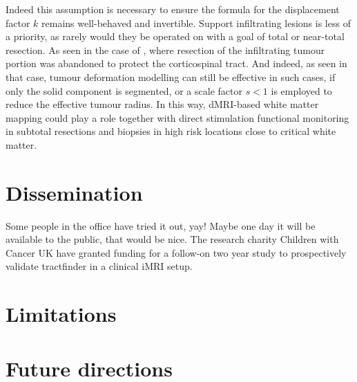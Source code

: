 Indeed this assumption is necessary to ensure the formula for the displacement factor $k$ remains well-behaved and invertible.
Support infiltrating lesions is less of a priority, as rarely  would they be operated on with a goal of total or near-total resection.
As seen in the case of , where resection of the infiltrating tumour portion was abandoned to protect the corticospinal tract.
And indeed, as seen in that case, tumour deformation modelling can still be effective in such cases, if only the solid component is segmented, or a scale factor $s<1$ is employed to reduce the effective tumour radius.
In this way, dMRI-based white matter mapping could play a role together with direct stimulation functional monitoring in subtotal resections and biopsies in high risk locations close to critical white matter.

\section{Dissemination}


Some people in the office have tried it out, yay!
Maybe one day it will be available to the public, that would be nice.
The research charity Children with Cancer UK have granted funding for a follow-on two year study to prospectively validate tractfinder in a clinical iMRI setup.

\section{Limitations}


\section{Future directions}

